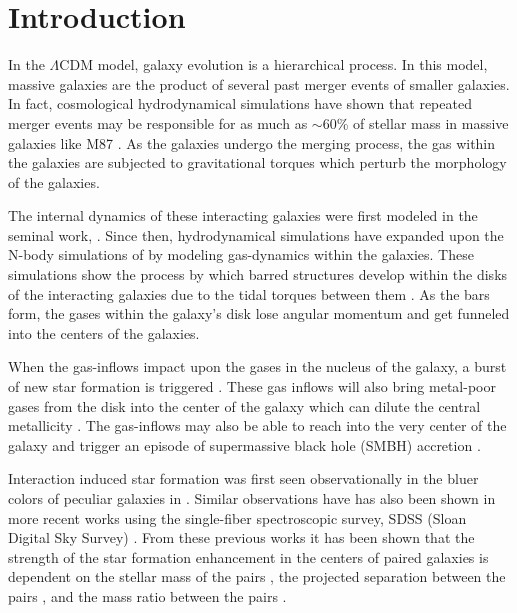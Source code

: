 \documentclass[iop,revtex4,twocolumn,apj,numberedappendix,appendixfloats]{emulateapj}
\begin{document}

\section{Introduction}\label{sec:intro}

In the $\Lambda$CDM model, galaxy evolution is a hierarchical process. In this model, massive galaxies are the product of several past merger events of smaller galaxies. In fact, cosmological hydrodynamical simulations have shown that repeated merger events may be responsible for as much as $\sim$60\% of stellar mass in massive galaxies like M87 \citep[e.g.,][]{Rodriguez-Gomez:2016,Pillepich:2018}. As the galaxies undergo the merging process, the gas within the galaxies are subjected to gravitational torques which perturb the morphology of the galaxies.

The internal dynamics of these interacting galaxies were first modeled in the seminal work, \citet{Toomre:1972}. Since then, hydrodynamical simulations have expanded upon the N-body simulations of \citet{Toomre:1972} by modeling gas-dynamics within the galaxies. These simulations show the process by which barred structures develop within the disks of the interacting galaxies due to the tidal torques between them \citep{Barnes:1991}. As the bars form, the gases within the galaxy's disk lose angular momentum and get funneled into the centers of the galaxies. 

When the gas-inflows impact upon the gases in the nucleus of the galaxy, a burst of new star formation is triggered \citep{Barnes:1996, Mihos:1996}. These gas inflows will also bring metal-poor gases from the disk into the center of the galaxy which can dilute the central metallicity \citep{Rupke:2010, Perez:2011, Scudder:2012}. The gas-inflows may also be able to reach into the very center of the galaxy and trigger an episode of supermassive black hole (SMBH) accretion \citep{Capelo:2017}. 

Interaction induced star formation was first seen observationally in the bluer colors of peculiar galaxies in \citet{Larson:1978}. Similar observations have has also been shown in more recent works using the single-fiber spectroscopic survey, SDSS (Sloan Digital Sky Survey) \citep{Ellison:2008, Li:2008, Scudder:2012, Patton:2013, Bustamante:2020}. From these previous works it has been shown that the strength of the star formation enhancement in the centers of paired galaxies is dependent on the stellar mass of the pairs \citep{Li:2008}, the projected separation between the pairs \citep{Ellison:2008, Li:2008, Scudder:2012}, and the mass ratio between the pairs \citep{Ellison:2008}. 
\end{document}
